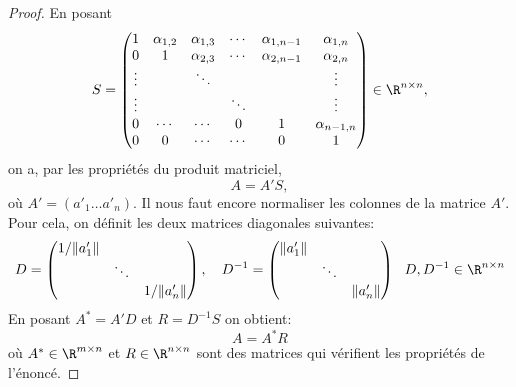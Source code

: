 \begin{proof}
En posant 
\begin{displaymath}
S = %
\begin{pmatrix}
1 & \alpha_{1,2} & \alpha_{1,3} & \cdots & \alpha_{1,n-1} & \alpha_{1,n}\\
0 & 1 & \alpha_{2,3} & \cdots & \alpha_{2,n-1} & \alpha_{2,n} \\
\vdots && \ddots &&& \vdots \\
\vdots &&& \ddots &&\vdots\\
0 & \cdots & \cdots&0& 1 & \alpha_{n-1,n}\\
0 & 0 & \cdots &\cdots & 0 & 1
\end{pmatrix} \in \R^{n \times n}, 
\end{displaymath}
on a, par les propriétés du produit matriciel,
\begin{displaymath}
A = A'S,  %
\end{displaymath}
où $A' = (a'_1 \dots a'_n)$. Il nous faut encore normaliser les colonnes de la matrice $A'$. Pour cela, on définit les deux matrices diagonales suivantes:
\begin{displaymath}
D=\begin{pmatrix}
1/\|a'_1\| & & \\
& \ddots & \\
& & 1/\|a'_n\|
\end{pmatrix} , \quad 
D^{-1}=\begin{pmatrix}
\|a'_1\| & & \\
& \ddots & \\
& & \|a'_n\|
\end{pmatrix} 
~~ D,D^{-1} \in \R^{n \times n}
\end{displaymath}
En posant $A^*=A'D$ et $R=D^{-1}S$ on obtient:
\begin{displaymath}
A=A^* R
\end{displaymath}
où $A^* \in \R^{m\times n}$ et $R \in \R^{n \times n}$ sont des matrices qui vérifient les propriétés de l'énoncé. 
\end{proof}


